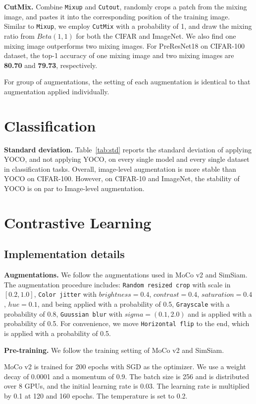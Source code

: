 \documentclass{article}
\begin{document}
\textbf{CutMix.} 
Combine \texttt{Mixup} and \texttt{Cutout}, randomly crops a patch from the mixing image, and pastes it into the corresponding position of the training image. Similar to \texttt{Mixup}, we employ \texttt{CutMix} with a probability of 1, and draw the mixing ratio from $Beta(1, 1)$ for both the CIFAR and ImageNet. We also find one mixing image outperforms two mixing images. For PreResNet18 on CIFAR-100 dataset, the top-1 accuracy of one mixing image and two mixing images are \textbf{80.70} and \textbf{79.73}, respectively.

For group of augmentations, the setting of each augmentation is identical to that augmentation applied individually.

\section{Classification} 
\textbf{Standard deviation.} 
Table~\ref{tab:std} reports the standard deviation of applying YOCO, and not applying YOCO, on every single model and every single dataset in classification tasks. Overall, image-level augmentation is more stable than YOCO on CIFAR-100. However, on CIFAR-10 and ImageNet, the stability of YOCO is on par to Image-level augmentation.


\section{Contrastive Learning} 
\label{sec:appendix_contrastive}
\subsection{Implementation details}
\textbf{Augmentations.} 
We follow the augmentations used in MoCo v2 and SimSiam. The augmentation procedure includes:  \texttt{Random resized crop} with scale in $[0.2,1.0]$,  \texttt{Color jitter} with $brightness = 0.4$, $contrast = 0.4$, $saturation = 0.4$, $hue = 0.1$, and being applied with a probability of 0.5, \texttt{Grayscale} with a probability of 0.8, \texttt{Guussian blur} with $sigma=(0.1, 2.0)$ and is applied with a probability of 0.5. For convenience, we move \texttt{Horizontal flip} to the end, which is applied with a probability of 0.5.

\textbf{Pre-training.} 
We follow the training setting of MoCo v2 and SimSiam. 

MoCo v2 is trained for 200 epochs with SGD as the optimizer. We use a weight decay of 0.0001 and a momentum of 0.9. The batch size is 256 and is distributed over 8 GPUs, and the initial learning rate is 0.03. The learning rate is multiplied by 0.1 at 120 and 160 epochs. The temperature is set to 0.2.
\end{document}
